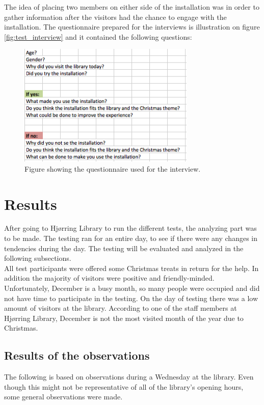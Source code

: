 The idea of placing two members on either side of the installation was in order to gather information after the visitors had the chance to engage with the installation. The questionnaire prepared for the interviews is illustration on figure \eqref{fig:test_interview} and it contained the following questions:

\begin{figure}[H] 
\centering 
\includegraphics[width=0.75\textwidth]{Pictures/Test/Interview.png} 
\caption{Figure showing the questionnaire used for the interview.} 
\label{fig:test_interview} 
\end{figure}

\section{Results}
After going to Hj{\o}rring Library to run the different tests, the analyzing part was to be made. The testing ran for an entire day, to see if there were any changes in tendencies during the day. The testing will be evaluated and analyzed in the following subsections.\\
All test participants were offered some Christmas treats in return for the help. In addition the majority of visitors were positive and friendly-minded. Unfortunately, December is a busy month, so many people were occupied and did not have time to participate in the testing. On the day of testing there was a low amount of visitors at the library. According to one of the staff members at Hj{\o}rring Library, December is not the most visited month of the year due to Christmas.

\subsection{Results of the observations}
The following is based on observations during a Wednesday at the library. Even though this might not be representative of all of the library's opening hours, some general observations were made.

